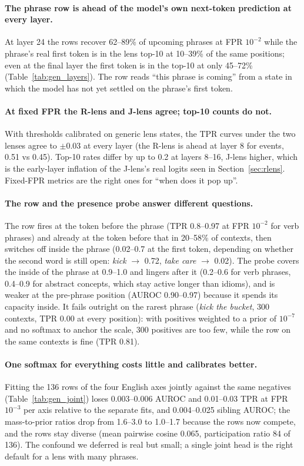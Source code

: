 \documentclass[11pt]{article}
\begin{document}
\paragraph{The phrase row is ahead of the model's own next-token prediction at every layer.}
At layer 24 the rows recover 62--89\% of upcoming phrases at FPR $10^{-2}$ while the phrase's real first token is in the lens top-10 at 10--39\% of the same positions; even at the final layer the first token is in the top-10 at only 45--72\% (Table~\ref{tab:gen_layers}). The row reads ``this phrase is coming'' from a state in which the model has not yet settled on the phrase's first token.

\paragraph{At fixed FPR the R-lens and J-lens agree; top-10 counts do not.}
With thresholds calibrated on generic lens states, the TPR curves under the two lenses agree to $\pm0.03$ at every layer (the R-lens is ahead at layer 8 for events, 0.51 vs 0.45). Top-10 rates differ by up to 0.2 at layers 8--16, J-lens higher, which is the early-layer inflation of the J-lens's real logits seen in Section~\ref{sec:rlens}. Fixed-FPR metrics are the right ones for ``when does it pop up''.

\paragraph{The row and the presence probe answer different questions.}
The row fires at the token before the phrase (TPR 0.8--0.97 at FPR $10^{-2}$ for verb phrases) and already at the token before that in 20--58\% of contexts, then switches off inside the phrase (0.02--0.7 at the first token, depending on whether the second word is still open: \emph{kick} $\to$ 0.72, \emph{take care} $\to$ 0.02). The probe covers the inside of the phrase at 0.9--1.0 and lingers after it (0.2--0.6 for verb phrases, 0.4--0.9 for abstract concepts, which stay active longer than idioms), and is weaker at the pre-phrase position (AUROC 0.90--0.97) because it spends its capacity inside. It fails outright on the rarest phrase (\emph{kick the bucket}, 300 contexts, TPR 0.00 at every position): with positives weighted to a prior of $10^{-7}$ and no softmax to anchor the scale, 300 positives are too few, while the row on the same contexts is fine (TPR 0.81).

\paragraph{One softmax for everything costs little and calibrates better.}
Fitting the 136 rows of the four English axes jointly against the same negatives (Table~\ref{tab:gen_joint}) loses 0.003--0.006 AUROC and 0.01--0.03 TPR at FPR $10^{-3}$ per axis relative to the separate fits, and 0.004--0.025 sibling AUROC; the mass-to-prior ratios drop from 1.6--3.0 to 1.0--1.7 because the rows now compete, and the rows stay diverse (mean pairwise cosine 0.065, participation ratio 84 of 136). The confound we deferred is real but small; a single joint head is the right default for a lens with many phrases.
\end{document}
